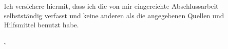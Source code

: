 \thispagestyle{empty}

\vspace*{0.8\textheight}
\noindent
Ich versichere hiermit, dass ich die von mir eingereichte Abschlussarbeit selbstständig verfasst und keine
anderen als die angegebenen Quellen und Hilfsmittel benutzt habe.

\vspace{15mm}
\noindent
\getSubmissionLocation{}, \hspace{5cm} \getAuthor{}

\cleardoublepage{}

